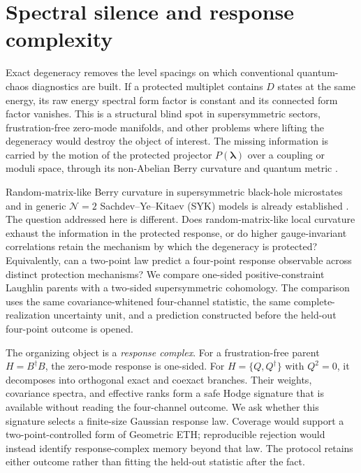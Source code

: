 \section{Spectral silence and response complexity}
\label{sec:introduction}

Exact degeneracy removes the level spacings on which conventional quantum-chaos diagnostics are built. If a protected multiplet contains \(D\) states at the same energy, its raw energy spectral form factor is constant and its connected form factor vanishes. This is a structural blind spot in supersymmetric sectors, frustration-free zero-mode manifolds, and other problems where lifting the degeneracy would destroy the object of interest. The missing information is carried by the motion of the protected projector \(P(\bm\lambda)\) over a coupling or moduli space, through its non-Abelian Berry curvature and quantum metric \cite{berry1984,wilczekzee1984,provostvallee1980,kato1950}.

Random-matrix-like Berry curvature in supersymmetric black-hole microstates and in generic \(\mathcal N=2\) Sachdev--Ye--Kitaev (SYK) models is already established \cite{chen2026berry,chen2024bps}. The question addressed here is different. Does random-matrix-like local curvature exhaust the information in the protected response, or do higher gauge-invariant correlations retain the mechanism by which the degeneracy is protected? Equivalently, can a two-point law predict a four-point response observable across distinct protection mechanisms? We compare one-sided positive-constraint Laughlin parents with a two-sided supersymmetric cohomology. The comparison uses the same covariance-whitened four-channel statistic, the same complete-realization uncertainty unit, and a prediction constructed before the held-out four-point outcome is opened.

The organizing object is a \emph{response complex}. For a frustration-free parent \(H=B^\dagger B\), the zero-mode response is one-sided. For \(H=\{Q,Q^\dagger\}\) with \(Q^2=0\), it decomposes into orthogonal exact and coexact branches. Their weights, covariance spectra, and effective ranks form a safe Hodge signature that is available without reading the four-channel outcome. We ask whether this signature selects a finite-size Gaussian response law. Coverage would support a two-point-controlled form of Geometric ETH; reproducible rejection would instead identify response-complex memory beyond that law. The protocol retains either outcome rather than fitting the held-out statistic after the fact.
